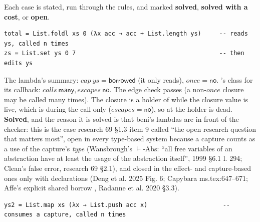 
Each case is stated, run through the rules, and marked \textbf{solved}, \textbf{solved with a cost}, or \textbf{open}.


\begin{Verbatim}
total = List.foldl xs 0 (λx acc → acc + List.length ys)     -- reads ys, called n times
zs = List.set ys 0 7                                        -- then edits ys
\end{Verbatim}

The lambda's summary: $\mathit{cap}\ \mathit{ys}=\mathsf{borrowed}$ (it only reads), $\mathit{once}=\mathsf{no}$. 's class for its callback: $\mathit{calls}\ \mathsf{many},\allowbreak{}\mathit{escapes}\ \mathsf{no}$. The edge check passes (a non-$\mathit{once}$ closure may be called many times). The closure is a holder of  while the closure value is live, which is during the  call only ($\mathit{escapes}=\mathsf{no}$), so at  the holder is dead. \textbf{Solved}, and the reason it is solved is that beni's lambdas are in front of the checker: this is the case research 69 §1.3 item 9 called “the open research question that matters most”, open in every type-based system because a capture counts as a use of the capture's \emph{type} (Wansbrough's $\vdash$-Abs: “all free variables of an abstraction have at least the usage of the abstraction itself”, 1999 §6.1 l. 294; Clean's  false error, research 69 §2.1), and closed in the effect- and capture-based ones only with declarations (Deng et al. 2025 Fig. 6; Capybara ms.tex:647–671; Affe's explicit shared borrow , Radanne et al. 2020 §3.3).

\begin{Verbatim}
ys2 = List.map xs (λx → List.push acc x)                     -- consumes a capture, called n times
\end{Verbatim}

